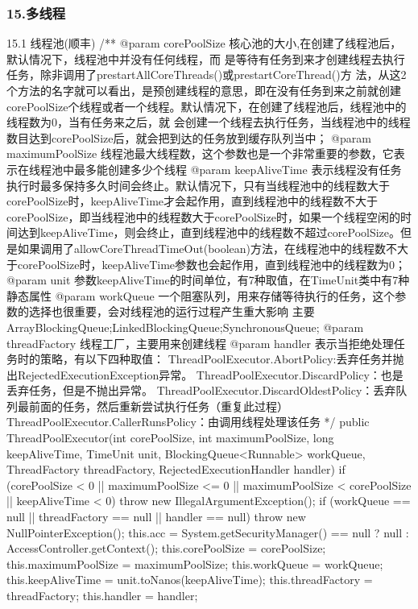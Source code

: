 \documentclass[UTF8]{ctexart}
\begin{document}
\subsubsection{15.多线程}
15.1 线程池(顺丰)
/**
@param corePoolSize 核心池的大小,在创建了线程池后，默认情况下，线程池中并没有任何线程，而  是等待有任务到来才创建线程去执行任务，除非调用了prestartAllCoreThreads()或prestartCoreThread()方    法，从这2个方法的名字就可以看出，是预创建线程的意思，即在没有任务到来之前就创建corePoolSize个线程或者一个线程。默认情况下，在创建了线程池后，线程池中的线程数为0，当有任务来之后，就    会创建一个线程去执行任务，当线程池中的线程数目达到corePoolSize后，就会把到达的任务放到缓存队列当中；
@param maximumPoolSize  线程池最大线程数，这个参数也是一个非常重要的参数，它表示在线程池中最多能创建多少个线程
@param keepAliveTime 表示线程没有任务执行时最多保持多久时间会终止。默认情况下，只有当线程池中的线程数大于corePoolSize时，keepAliveTime才会起作用，直到线程池中的线程数不大于corePoolSize，即当线程池中的线程数大于corePoolSize时，如果一个线程空闲的时间达到keepAliveTime，则会终止，直到线程池中的线程数不超过corePoolSize。但是如果调用了allowCoreThreadTimeOut(boolean)方法，在线程池中的线程数不大于corePoolSize时，keepAliveTime参数也会起作用，直到线程池中的线程数为0；
@param unit 参数keepAliveTime的时间单位，有7种取值，在TimeUnit类中有7种静态属性
@param workQueue 一个阻塞队列，用来存储等待执行的任务，这个参数的选择也很重要，会对线程池的运行过程产生重大影响 主要ArrayBlockingQueue;LinkedBlockingQueue;SynchronousQueue;
@param threadFactory 线程工厂，主要用来创建线程
@param handler 表示当拒绝处理任务时的策略，有以下四种取值：
ThreadPoolExecutor.AbortPolicy:丢弃任务并抛出RejectedExecutionException异常。
ThreadPoolExecutor.DiscardPolicy：也是丢弃任务，但是不抛出异常。
ThreadPoolExecutor.DiscardOldestPolicy：丢弃队列最前面的任务，然后重新尝试执行任务（重复此过程）
ThreadPoolExecutor.CallerRunsPolicy：由调用线程处理该任务
  */
public ThreadPoolExecutor(int corePoolSize,
                       int maximumPoolSize,
                       long keepAliveTime,
                       TimeUnit unit,
                       BlockingQueue<Runnable> workQueue,
                       ThreadFactory threadFactory,
                       RejectedExecutionHandler handler) {
 if (corePoolSize < 0 ||
     maximumPoolSize <= 0 ||
     maximumPoolSize < corePoolSize ||
     keepAliveTime < 0)
     throw new IllegalArgumentException();
 if (workQueue == null || threadFactory == null || handler == null)
     throw new NullPointerException();
 this.acc = System.getSecurityManager() == null ?
         null :
         AccessController.getContext();
 this.corePoolSize = corePoolSize;
 this.maximumPoolSize = maximumPoolSize;
 this.workQueue = workQueue;
 this.keepAliveTime = unit.toNanos(keepAliveTime);
 this.threadFactory = threadFactory;
 this.handler = handler;
}
\end{document}
